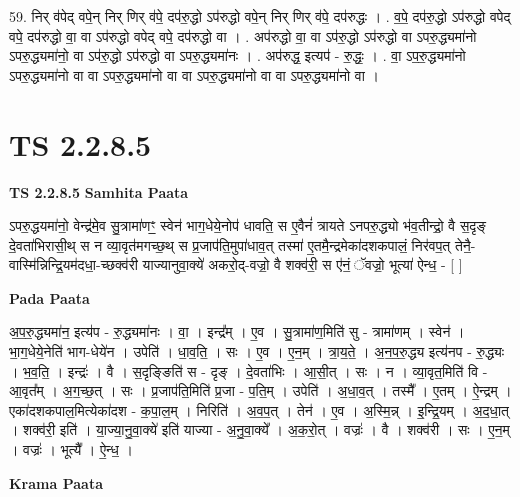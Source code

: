 \documentclass[17pt]{extarticle}
\begin{document}
59. निर् व॑पेद् वपे॒न् निर् णिर् व॑पे॒ दप॑रु॒द्धो ऽप॑रुद्धो वपे॒न् निर् णिर् व॑पे॒ दप॑रुद्धः । . व॒पे॒ दप॑रु॒द्धो ऽप॑रुद्धो वपेद् वपे॒ दप॑रुद्धो वा॒ वा ऽप॑रुद्धो वपेद् वपे॒ दप॑रुद्धो वा । . अप॑रुद्धो वा॒ वा ऽप॑रु॒द्धो ऽप॑रुद्धो वा ऽपरु॒द्ध्यमा॑नो ऽपरु॒द्ध्यमा॑नो॒ वा ऽप॑रु॒द्धो ऽप॑रुद्धो वा ऽपरु॒द्ध्यमा॑नः । . अप॑रुद्ध॒ इत्यप॑ - रु॒द्धः॒ । . वा॒ ऽप॒रु॒द्ध्यमा॑नो ऽपरु॒द्ध्यमा॑नो वा वा ऽपरु॒द्ध्यमा॑नो वा वा ऽपरु॒द्ध्यमा॑नो वा वा ऽपरु॒द्ध्यमा॑नो वा । \newline
\pagebreak
{}
\section*{ TS 2.2.8.5 }

\textbf{TS 2.2.8.5 } \newline
\textbf{Samhita Paata} \newline

ऽपरु॒द्धयमा॑नो॒ वेन्द्र॑मे॒व सु॒त्रामा॑णꣳ॒॒ स्वेन॑ भाग॒धेये॒नोप॑ धावति॒ स ए॒वैनं॑ त्रायते ऽनपरु॒द्ध्यो भ॑व॒तीन्द्रो॒ वै स॒दृङ् दे॒वता॑भिरासी॒थ् स न व्या॒वृत॑मगच्छ॒थ् स प्र॒जाप॑ति॒मुपा॑धाव॒त् तस्मा॑ ए॒तमै॒न्द्रमेका॑दशकपालं॒ निर॑वप॒त् तेनै॒-वास्मि॑न्निन्द्रि॒यम॑दधा॒-च्छक्व॑री याज्यानुवा॒क्ये॑ अकरो॒द्-वज्रो॒ वै शक्व॑री॒ स ए॑नं॒ ॅवज्रो॒ भूत्या॑ ऐन्ध॒ - [  ] \newline

\textbf{Pada Paata} \newline

अ॒प॒रु॒द्ध्यमा॑न॒ इत्य॑प - रु॒द्ध्यमा॑नः । वा॒ । इन्द्र᳚म् । ए॒व । सु॒त्रामा॑ण॒मिति॑ सु - त्रामा॑णम् । स्वेन॑ । भा॒ग॒धेये॒नेति॑ भाग-धेये॑न । उपेति॑ । धा॒व॒ति॒ । सः । ए॒व । ए॒न॒म् । त्रा॒य॒ते॒ । अ॒न॒प॒रु॒द्ध्य इत्य॑नप - रु॒द्ध्यः । भ॒व॒ति॒ । इन्द्रः॑ । वै । स॒दृङ्ङिति॑ स - दृङ् । दे॒वता॑भिः । आ॒सी॒त् । सः । न । व्या॒वृत॒मिति॑ वि - आ॒वृत᳚म् । अ॒ग॒च्छ॒त् । सः । प्र॒जाप॑ति॒मिति॑ प्र॒जा - प॒ति॒म् । उपेति॑ । अ॒धा॒व॒त् । तस्मै᳚ । ए॒तम् । ऐ॒न्द्रम् । एका॑दशकपाल॒मित्येका॑दश - क॒पा॒ल॒म् । निरिति॑ । अ॒व॒प॒त् । तेन॑ । ए॒व । अ॒स्मि॒न्न् । इ॒न्द्रि॒यम् । अ॒द॒धा॒त् । शक्व॑री॒ इति॑ । या॒ज्या॒नु॒वा॒क्ये॑ इति॑ याज्या - अ॒नु॒वा॒क्ये᳚ । अ॒क॒रो॒त् । वज्रः॑ । वै । शक्व॑री । सः । ए॒न॒म् । वज्रः॑ । भूत्यै᳚ । ऐ॒न्ध॒ ।  \newline


\textbf{Krama Paata} \newline
\end{document}
